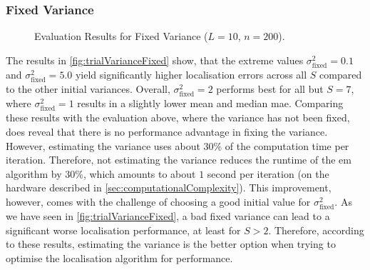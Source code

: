 \subsubsection*{Fixed Variance}

\begin{figure}[H]
\iftoggle{quick}{
    \texttt{[image: plots/boxplots/boxplot-joined-var-val]}
}{%
    
}
	\caption[Evaluation Results for Fixed Variance]{Evaluation Results for Fixed Variance ($L=10$, $n=200$).}
	\label{fig:trialVarianceFixed}
\end{figure}

The results in \autoref{fig:trialVarianceFixed} show, that the extreme values $\sigma^2_{\text{fixed}}=0.1$ and $\sigma^2_{\text{fixed}}=5.0$ yield significantly higher localisation errors across all $S$ compared to the other initial variances. Overall, $\sigma^2_{\text{fixed}}=2$ performs best for all but $S=7$, where $\sigma^2_{\text{fixed}}=1$ results in a slightly lower mean and median \gls{mae}. Comparing these results with the evaluation above, where the variance has not been fixed, does reveal that there is no performance advantage in fixing the variance. However, estimating the variance uses about 30\% of the computation time per iteration. Therefore, not estimating the variance reduces the runtime of the \gls{em} algorithm by 30\%, which amounts to about $1$ second per iteration (on the hardware described in \autoref{sec:computationalComplexity}). This improvement, however, comes with the challenge of choosing a good initial value for $\sigma^2_{\text{fixed}}$. As we have seen in \autoref{fig:trialVarianceFixed}, a bad fixed variance can lead to a significant worse localisation performance, at least for $S>2$. Therefore, according to these results, estimating the variance is the better option when trying to optimise the localisation algorithm for performance.